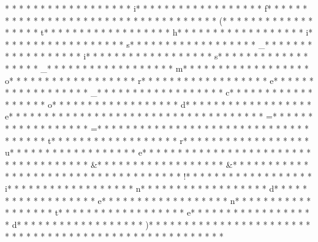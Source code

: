 * * *  * * *  * * *  *  * * *  *  * * *  * i* * *  * * *  * * *  *  * * *  *  * * *  * f* * *  * * *  * * *  *  * * *  *  * * *  *  * * *  * * *  * * *  *  * * *  *  * * *  * (* * *  * * *  * * *  *  * * *  *  * * *  * t* * *  * * *  * * *  *  * * *  *  * * *  * h* * *  * * *  * * *  *  * * *  *  * * *  * i* * *  * * *  * * *  *  * * *  *  * * *  * s* * *  * * *  * * *  *  * * *  *  * * *  * _* * *  * * *  * * *  *  * * *  *  * * *  * i* * *  * * *  * * *  *  * * *  *  * * *  * s* * *  * * *  * * *  *  * * *  *  * * *  * _* * *  * * *  * * *  *  * * *  *  * * *  * m* * *  * * *  * * *  *  * * *  *  * * *  * o* * *  * * *  * * *  *  * * *  *  * * *  * r* * *  * * *  * * *  *  * * *  *  * * *  * e* * *  * * *  * * *  *  * * *  *  * * *  * _* * *  * * *  * * *  *  * * *  *  * * *  * c* * *  * * *  * * *  *  * * *  *  * * *  * o* * *  * * *  * * *  *  * * *  *  * * *  * d* * *  * * *  * * *  *  * * *  *  * * *  * e* * *  * * *  * * *  *  * * *  *  * * *  *  * * *  * * *  * * *  *  * * *  *  * * *  * =* * *  * * *  * * *  *  * * *  *  * * *  * =* * *  * * *  * * *  *  * * *  *  * * *  *  * * *  * * *  * * *  *  * * *  *  * * *  * t* * *  * * *  * * *  *  * * *  *  * * *  * r* * *  * * *  * * *  *  * * *  *  * * *  * u* * *  * * *  * * *  *  * * *  *  * * *  * e* * *  * * *  * * *  *  * * *  *  * * *  *  * * *  * * *  * * *  *  * * *  *  * * *  * &* * *  * * *  * * *  *  * * *  *  * * *  * &* * *  * * *  * * *  *  * * *  *  * * *  *  * * *  * * *  * * *  *  * * *  *  * * *  * !* * *  * * *  * * *  *  * * *  *  * * *  * i* * *  * * *  * * *  *  * * *  *  * * *  * n* * *  * * *  * * *  *  * * *  *  * * *  * d* * *  * * *  * * *  *  * * *  *  * * *  * e* * *  * * *  * * *  *  * * *  *  * * *  * n* * *  * * *  * * *  *  * * *  *  * * *  * t* * *  * * *  * * *  *  * * *  *  * * *  * e* * *  * * *  * * *  *  * * *  *  * * *  * d* * *  * * *  * * *  *  * * *  *  * * *  * )* * *  * * *  * * *  *  * * *  *  * * *  *  * * *  * * *  * * *  *  * * *  *  * * *  * {* * *  * * *  * * *  *  * * *  *  * * *  * 
}
